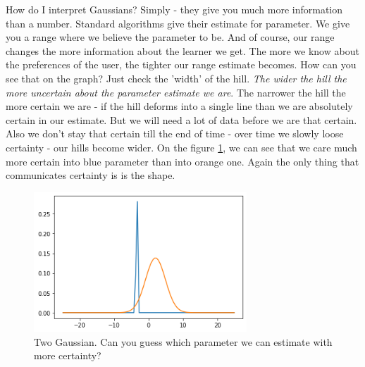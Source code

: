 \documentclass{article}
\begin{document}
    
How do I interpret Gaussians? Simply - they give you much more information than a number. Standard algorithms give their estimate for parameter. We give you a range where we believe the parameter to be. And of course, our range changes the more information about the learner we get. 
\bigbreak
The more we know about the preferences of the user, the tighter our range estimate becomes. How can you see that on the graph? Just check the 'width' of the hill. \emph{The wider the hill the more uncertain about the parameter estimate we are}. The narrower the hill the more certain we are - if the hill deforms into a single line than we are absolutely certain in our estimate. But we will need a lot of data before we are that certain. Also we don't stay that certain till the end of time - over time we slowly loose certainty - our hills become wider. On the figure \ref{f:g}, we can see that we care much more certain into blue parameter than into orange one. Again the only thing that communicates certainty is is the shape. 
 

\begin{figure}[h!]
\centering
\caption{Two Gaussian. Can you guess which parameter we can estimate with more certainty?}
\label{f:g}
\includegraphics[width=8cm]{two_gauss}
\end{figure}
\end{document}
